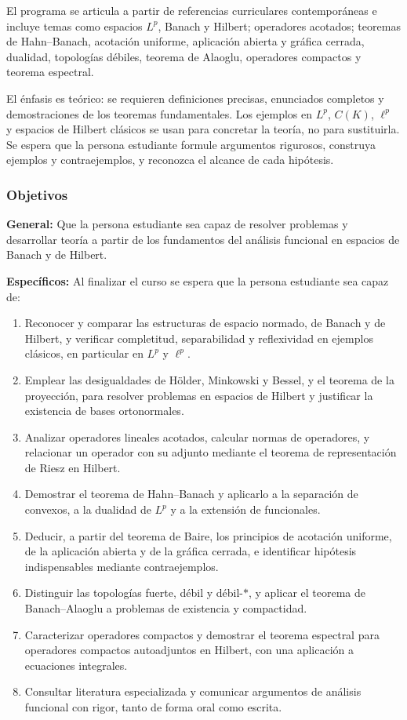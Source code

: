 \begin{refsection}
El programa se articula a partir de referencias curriculares contemporáneas e incluye temas como espacios $L^p$, Banach y Hilbert; operadores acotados; teoremas de Hahn--Banach, acotación uniforme, aplicación abierta y gráfica cerrada, dualidad, topologías débiles, teorema de Alaoglu, operadores compactos y teorema espectral.

El énfasis es teórico: se requieren definiciones precisas, enunciados completos y demostraciones de los teoremas fundamentales. Los ejemplos en $L^p$, $C(K)$, $\ell^p$ y espacios de Hilbert clásicos se usan para concretar la teoría, no para sustituirla. Se espera que la persona estudiante formule argumentos rigurosos, construya ejemplos y contraejemplos, y reconozca el alcance de cada hipótesis.

\subsubsection*{Objetivos}

\textbf{General:} Que la persona estudiante sea capaz de resolver problemas y desarrollar teoría a partir de los fundamentos del análisis funcional en espacios de Banach y de Hilbert.

\textbf{Específicos:} Al finalizar el curso se espera que la persona estudiante sea capaz de:

\begin{enumerate}
\item Reconocer y comparar las estructuras de espacio normado, de Banach y de Hilbert, y verificar completitud, separabilidad y reflexividad en ejemplos clásicos, en particular en $L^p$ y $\ell^p$.
\item Emplear las desigualdades de Hölder, Minkowski y Bessel, y el teorema de la proyección, para resolver problemas en espacios de Hilbert y justificar la existencia de bases ortonormales.
\item Analizar operadores lineales acotados, calcular normas de operadores, y relacionar un operador con su adjunto mediante el teorema de representación de Riesz en Hilbert.
\item Demostrar el teorema de Hahn--Banach y aplicarlo a la separación de convexos, a la dualidad de $L^p$ y a la extensión de funcionales.
\item Deducir, a partir del teorema de Baire, los principios de acotación uniforme, de la aplicación abierta y de la gráfica cerrada, e identificar hipótesis indispensables mediante contraejemplos.
\item Distinguir las topologías fuerte, débil y débil-$*$, y aplicar el teorema de Banach--Alaoglu a problemas de existencia y compactidad.
\item Caracterizar operadores compactos y demostrar el teorema espectral para operadores compactos autoadjuntos en Hilbert, con una aplicación a ecuaciones integrales.
\item Consultar literatura especializada y comunicar argumentos de análisis funcional con rigor, tanto de forma oral como escrita.
\end{enumerate}


\end{refsection}
